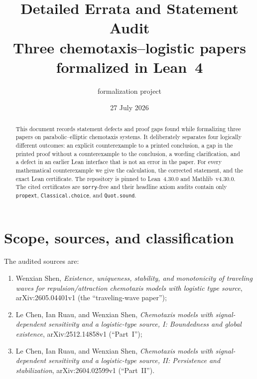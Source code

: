 \documentclass[11pt]{article}
\title{Detailed Errata and Statement Audit\\
\large Three chemotaxis--logistic papers formalized in Lean~4}
\author{\code{ShenWork} formalization project}
\date{27 July 2026}
\newcommand{\code}[1]{\nolinkurl{#1}}
\begin{document}
\maketitle

\begin{abstract}
This document records statement defects and proof gaps found while formalizing
three papers on parabolic--elliptic chemotaxis systems.  It deliberately
separates four logically different outcomes: an explicit counterexample to a
printed conclusion, a gap in the printed proof without a counterexample to the
conclusion, a wording clarification, and a defect in an earlier Lean interface
that is not an error in the paper.  For every mathematical counterexample we
give the calculation, the corrected statement, and the exact Lean certificate.
The repository is pinned to Lean~4.30.0 and Mathlib~v4.30.0.  The cited
certificates are \code{sorry}-free and their headline axiom audits contain only
\code{propext}, \code{Classical.choice}, and \code{Quot.sound}.
\end{abstract}

\tableofcontents

\section{Scope, sources, and classification}

The audited sources are:
\begin{enumerate}[leftmargin=2em]
\item Wenxian Shen, \emph{Existence, uniqueness, stability, and monotonicity
  of traveling waves for repulsion/attraction chemotaxis models with logistic
  type source}, arXiv:2605.04401v1 (the ``traveling-wave paper'');
\item Le Chen, Ian Ruau, and Wenxian Shen,
  \emph{Chemotaxis models with signal-dependent sensitivity and a
  logistic-type source, I: Boundedness and global existence},
  arXiv:2512.14858v1 (``Part~I'');
\item Le Chen, Ian Ruau, and Wenxian Shen,
  \emph{Chemotaxis models with signal-dependent sensitivity and a
  logistic-type source, II: Persistence and stabilization},
  arXiv:2604.02599v1 (``Part~II'').
\end{enumerate}
\end{document}
